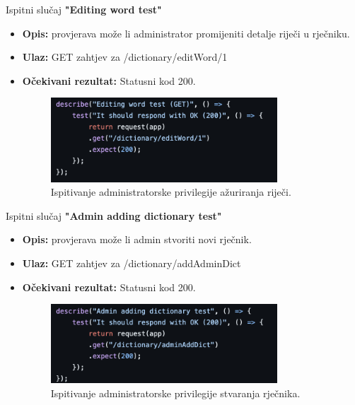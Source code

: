 			Ispitni slučaj \textbf{"Editing word test"}
			\begin{itemize}
				\item \textbf{Opis:} provjerava može li administrator promijeniti detalje riječi u rječniku.
				\item \textbf{Ulaz:} GET zahtjev za /dictionary/editWord/1
				\item \textbf{Očekivani rezultat:} Statusni kod 200.
				\begin{figure}[h]
					\centering
					\includegraphics[width=0.8\textwidth]{slike/testovi/admin_edit_word_test.png}
					\caption{Ispitivanje administratorske privilegije ažuriranja riječi.}
					\label{fig:testovi_admin_slika}
				\end{figure}
			\end{itemize}

			Ispitni slučaj \textbf{"Admin adding dictionary test"}
			\begin{itemize}
				\item \textbf{Opis:} provjerava može li admin stvoriti novi rječnik.
				\item \textbf{Ulaz:} GET zahtjev za /dictionary/addAdminDict
				\item \textbf{Očekivani rezultat:} Statusni kod 200.
				\begin{figure}[h]
					\centering
					\includegraphics[width=0.8\textwidth]{slike/testovi/admin_add_dictionary_test.png}
					\caption{Ispitivanje administratorske privilegije stvaranja rječnika.}
					\label{fig:testovi_admin_slika}
				\end{figure}
			\end{itemize}
			\newpage
			
